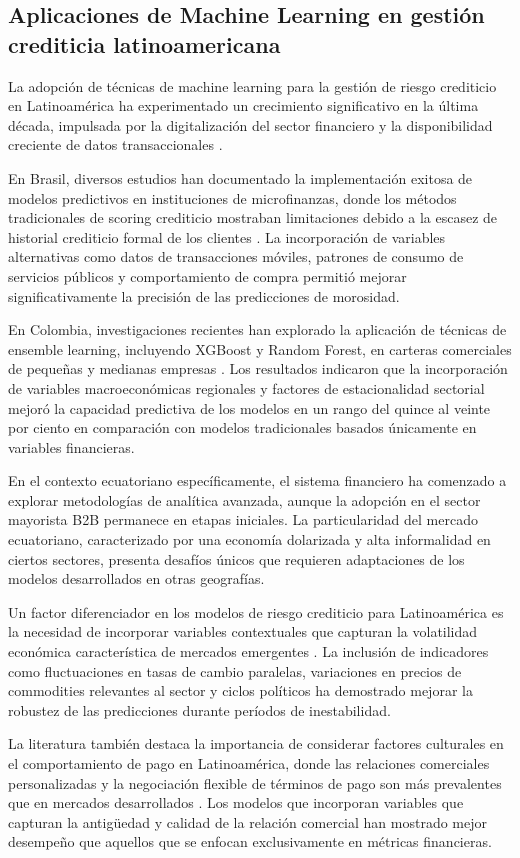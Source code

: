 \subsection{Aplicaciones de Machine Learning en gestión crediticia latinoamericana}
La adopción de técnicas de machine learning para la gestión de riesgo crediticio en Latinoamérica ha experimentado un crecimiento significativo en la última década, impulsada por la digitalización del sector financiero y la disponibilidad creciente de datos transaccionales \citep{barroso2022machine}.

En Brasil, diversos estudios han documentado la implementación exitosa de modelos predictivos en instituciones de microfinanzas, donde los métodos tradicionales de scoring crediticio mostraban limitaciones debido a la escasez de historial crediticio formal de los clientes \citep{oreski2014genetic}. La incorporación de variables alternativas como datos de transacciones móviles, patrones de consumo de servicios públicos y comportamiento de compra permitió mejorar significativamente la precisión de las predicciones de morosidad.

En Colombia, investigaciones recientes han explorado la aplicación de técnicas de ensemble learning, incluyendo XGBoost y Random Forest, en carteras comerciales de pequeñas y medianas empresas \citep{pena2021credit}. Los resultados indicaron que la incorporación de variables macroeconómicas regionales y factores de estacionalidad sectorial mejoró la capacidad predictiva de los modelos en un rango del quince al veinte por ciento en comparación con modelos tradicionales basados únicamente en variables financieras.

En el contexto ecuatoriano específicamente, el sistema financiero ha comenzado a explorar metodologías de analítica avanzada, aunque la adopción en el sector mayorista B2B permanece en etapas iniciales. La particularidad del mercado ecuatoriano, caracterizado por una economía dolarizada y alta informalidad en ciertos sectores, presenta desafíos únicos que requieren adaptaciones de los modelos desarrollados en otras geografías.

Un factor diferenciador en los modelos de riesgo crediticio para Latinoamérica es la necesidad de incorporar variables contextuales que capturan la volatilidad económica característica de mercados emergentes \citep{barroso2022machine}. La inclusión de indicadores como fluctuaciones en tasas de cambio paralelas, variaciones en precios de commodities relevantes al sector y ciclos políticos ha demostrado mejorar la robustez de las predicciones durante períodos de inestabilidad.

La literatura también destaca la importancia de considerar factores culturales en el comportamiento de pago en Latinoamérica, donde las relaciones comerciales personalizadas y la negociación flexible de términos de pago son más prevalentes que en mercados desarrollados \citep{pena2021credit}. Los modelos que incorporan variables que capturan la antigüedad y calidad de la relación comercial han mostrado mejor desempeño que aquellos que se enfocan exclusivamente en métricas financieras.

